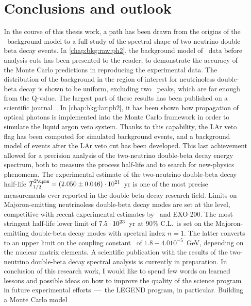
\chapter*{Conclusions and outlook}%
\label{chap:concl}

In the course of this thesis work, a path has been drawn from the origins of the \gerda\
background model to a full study of the spectral shape of two-neutrino double-beta decay
events. In \cref{chap:bkg:raw:ph2}, the background model of \gerdatwo\ data before
analysis cuts has been presented to the reader, to demonstrate the accuracy of the Monte
Carlo predictions in reproducing the experimental data. The distribution of the background
in the region of interest for neutrinoless double-beta decay is shown to be uniform,
excluding two \g\ peaks, which are far enough from the Q-value. The largest part of these
results has been published on a scientific journal~\cite{Agostini2019b}. In
\cref{chap:bkg:lar:ph2}, it has been shown how propagation of optical photons is
implemented into the Monte Carlo framework in order to simulate the liquid argon veto
system. Thanks to this capability, the LAr veto flag has been computed for simulated
background events, and a background model of events after the LAr veto cut has been
developed. This last achievement allowed for a precision analysis of the two-neutrino
double-beta decay energy spectrum, both to measure the process half-life and to search for
new-physics phenomena. The experimental estimate of the two-neutrino double-beta decay
half-life $\thalftwoM = \thalftwovalueshort$~yr is one of the most precise measurements
ever reported in the double-beta decay research field. Limits on Majoron-emitting
neutrinoless double-beta decay modes are set at the \powtenyr{23} level, competitive with
recent experimental estimates by \kamlandzen\ and EXO-200. The most stringent half-life
lower limit of $7.5 \cdot 10^{23}$~yr at 90\% C.L.~is set on the Majoron-emitting
double-beta decay modes with spectral index $n=1$. The latter converts to an upper limit
on the coupling constant \ga\ of $1.8{-}4.0 10^{-5}$~GeV, depending on the nuclear matrix
elements. A scientific publication with the results of the two-neutrino double-beta decay
spectral analysis is currently in preparation.
\newpar
In conclusion of this research work, I would like to spend few words on learned lessons
and possible ideas on how to improve the quality of the science program in future
experimental efforts~---~the LEGEND program, in particular. Building a Monte Carlo model
